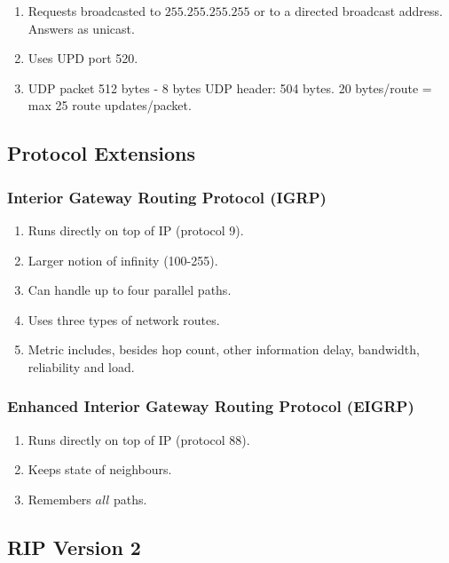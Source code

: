 \documentclass{article}
\begin{document}
\begin{enumerate}
	\item Requests broadcasted to $255.255.255.255$ or to a directed broadcast address. Answers as unicast.
	\item Uses UPD port 520.
	\item UDP packet 512 bytes - 8 bytes UDP header: 504 bytes. 20 bytes/route = max 25 route updates/packet.
\end{enumerate}


\subsection{Protocol Extensions}


\subsubsection{Interior Gateway Routing Protocol (IGRP)}

\begin{enumerate}
	\item Runs directly on top of IP (protocol 9).
	\item Larger notion of infinity (100-255).
	\item Can handle up to four parallel paths.
	\item Uses three types of network routes.
	\item Metric includes, besides hop count, other information {delay, bandwidth, reliability and load}.
\end{enumerate}





\subsubsection{Enhanced Interior Gateway Routing Protocol (EIGRP)}

\begin{enumerate}
	\item Runs directly on top of IP (protocol 88).
	\item Keeps state of neighbours.
	\item Remembers $all$ paths.
\end{enumerate}

\subsection{RIP Version 2}
\end{document}

